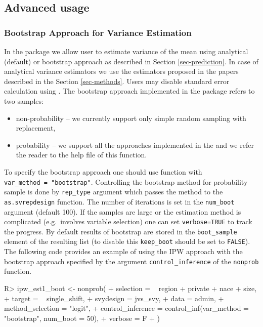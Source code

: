 \documentclass[
]{jss}
\begin{document}
\subsection{Advanced usage}\label{advanced-usage}

\subsubsection{Bootstrap Approach for Variance
Estimation}\label{bootstrap-approach-for-variance-estimation}

In the package we allow user to estimate variance of the mean using
analytical (default) or bootstrap approach as described in Section
\ref{sec-prediction}. In case of analytical variance estimators we use
the estimators proposed in the papers described in the Section
\ref{sec-methods}. Users may disable standard error calculation using
. The bootstrap approach implemented in the
package refers to two samples:

\begin{itemize}
\item non-probability -- we currently support only simple random sampling with replacement,
\item probability -- we support all the approaches implemented in the  and we refer the reader to the help file of this function. 
\end{itemize}

To specify the bootstrap approach one should use 
function with \texttt{var\_method\ =\ "bootstrap"}. Controlling the
bootstrap method for probability sample is done by \texttt{rep\_type}
argument which passes the method to the \texttt{as.svrepdesign}
function. The number of iterations is set in the \texttt{num\_boot}
argument (default 100). If the samples are large or the estimation
method is complicated (e.g.~involves variable selection) one can set
\texttt{verbose=TRUE} to track the progress. By default results of
bootstrap are stored in the \texttt{boot\_sample} element of the
resulting list (to disable this \texttt{keep\_boot} should be set to
\texttt{FALSE}). The following code provides an example of using the IPW
approach with the bootstrap approach specified by the argument
\texttt{control\_inference} of the \texttt{nonprob} function.

\begin{CodeChunk}
\begin{CodeInput}
R> ipw_est1_boot <- nonprob(
+   selection = ~ region + private + nace + size,
+   target = ~ single_shift,
+   svydesign = jvs_svy,
+   data = admin,
+   method_selection = "logit",
+   control_inference = control_inf(var_method = "bootstrap", num_boot = 50),
+   verbose = F
+ )
\end{CodeInput}
\end{CodeChunk}
\end{document}
